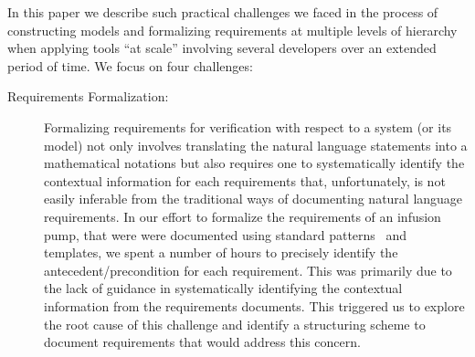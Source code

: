 In this paper we describe such practical challenges we faced in the process of constructing models and formalizing requirements at multiple levels of hierarchy when applying tools ``at scale'' involving several developers over an extended period of time.  We focus on four challenges:
\begin{description}
        \item[Requirements Formalization:] Formalizing requirements for verification with respect to a system (or its model) not only involves translating the natural language statements into a mathematical notations but also requires one to systematically identify the contextual information for each requirements that, unfortunately, is not easily inferable from the traditional ways of documenting natural language requirements. In our effort to formalize the requirements of an infusion pump, that were were documented using standard patterns~\cite{mavin2009easy} and templates, we spent a number of hours to precisely identify the antecedent/precondition for each requirement. This was primarily due to the lack of guidance in systematically identifying the contextual information from the requirements documents. This  triggered us to explore the root cause of this challenge and  identify a structuring scheme to document requirements that would address this concern.


\end{description}
